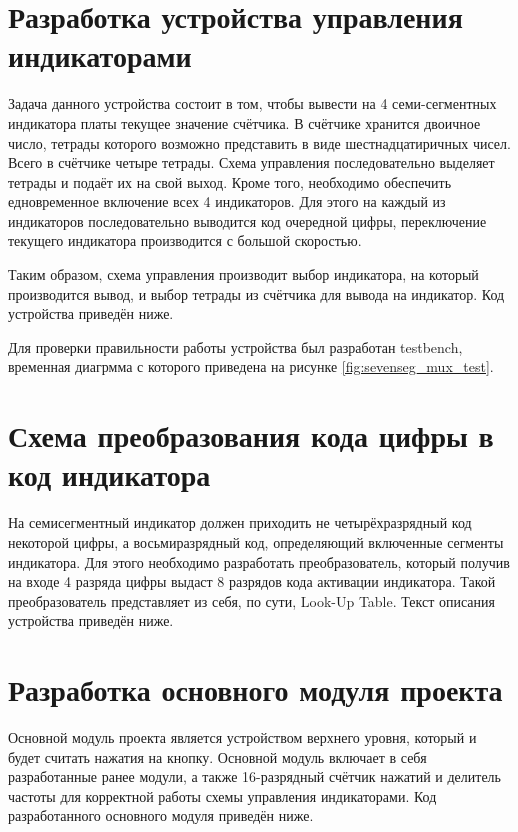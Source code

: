 \documentclass[a4paper, 14pt]{extarticle}
\begin{document}
    \section{Разработка устройства управления индикаторами}
    Задача данного устройства состоит в том, чтобы вывести на 4 семи-сегментных индикатора платы текущее значение счётчика.
    В счётчике хранится двоичное число, тетрады которого возможно представить в виде шестнадцатиричных чисел. Всего в счётчике четыре тетрады. Схема управления последовательно выделяет тетрады и подаёт их на свой выход.
    Кроме того, необходимо обеспечить едновременное включение всех 4 индикаторов. Для этого на каждый из индикаторов последовательно выводится код очередной цифры, переключение текущего индикатора производится с большой скоростью.
    
    Таким образом, схема управления производит выбор индикатора, на который производится вывод, и выбор тетрады из счётчика для вывода на индикатор. Код устройства приведён ниже.

    Для проверки правильности работы устройства был разработан testbench, временная диагрмма с которого приведена на рисунке \ref{fig:sevenseg_mux_test}.

    \section{Схема преобразования кода цифры в код индикатора}
    На семисегментный индикатор должен приходить не четырёхразрядный код некоторой цифры, а восьмиразрядный код, определяющий включенные сегменты индикатора.
    Для этого необходимо разработать преобразователь, который получив на входе 4 разряда цифры выдаст 8 разрядов кода активации индикатора.
    Такой преобразователь представляет из себя, по сути, Look-Up Table.
    Текст описания устройства приведён ниже.

    \section{Разработка основного модуля проекта}
    Основной модуль проекта является устройством верхнего уровня, который и будет считать нажатия на кнопку.
    Основной модуль включает в себя разработанные ранее модули, а также 16-разрядный счётчик нажатий и делитель частоты для корректной работы схемы управления индикаторами.
    Код разработанного основного модуля приведён ниже.
\end{document}
